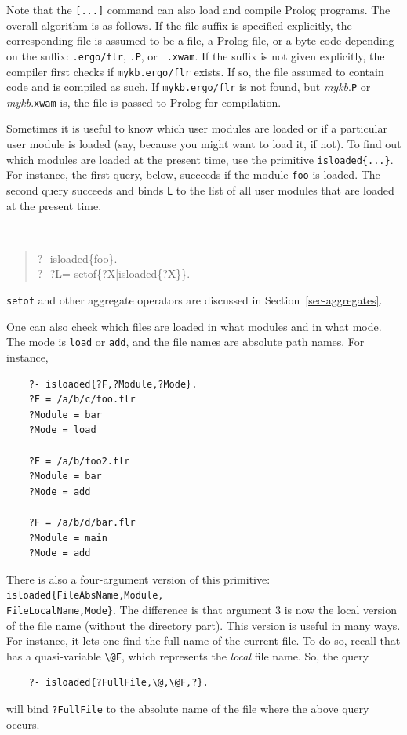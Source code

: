 \documentclass[11pt]{article}
\newcommand{\ERGO}{\mbox{\smaller{\ensuremath{\cal{E}}\smaller{{\sc{RGO}}}}}\xspace}
\newcommand{\FLSYSTEM}{\ERGO}
\newcommand{\flrext}{flr\xspace}
\newcommand{\ergoext}{ergo\xspace}
\newcommand{\bs}{\textbackslash}
\newcommand{\ofile}{xwam}
\begin{document}
Note that the {\tt [...]} command can also load and compile Prolog programs.
The overall algorithm is as follows. If the file suffix is specified
explicitly, the corresponding file is assumed to be a \FLSYSTEM file, a Prolog
file, or a byte code depending on the suffix: {\tt .\ergoext/\flrext}, {\tt .P}, or {\tt
  .\ofile}. If the suffix is not given explicitly, the compiler first checks if
\texttt{mykb.\ergoext/\flrext}  exists. If so, the file assumed to contain \FLSYSTEM
code and is compiled as such. If \texttt{mykb.\ergoext/\flrext}  is not found, but {\it
  mykb}.{\tt P} or {\it mykb}.{\tt xwam} is, the file is passed to Prolog for
compilation.


Sometimes it is useful to know which user modules are loaded or if a
particular user module is loaded (say, because you might want to load it,
if not).  To find out which modules are loaded at the present time, use the
primitive {\tt isloaded\{...\}}. For instance, the first query,
below, succeeds if the module {\tt foo} is loaded. The second query
succeeds and binds {\tt L} to the list of all user modules that are loaded
at the present time.
{\tt
\begin{quote}
 ?- isloaded\{foo\}.\\
 ?- ?L= setof\{?X|isloaded\{?X\}\}.
\end{quote}
}
\texttt{setof} and other aggregate operators are discussed in
Section~\ref{sec-aggregates}.

One can also check which files are loaded in what modules and in what mode.
The mode is \texttt{load} or \texttt{add}, and the file names are absolute
path names. For instance, 
\begin{verbatim}
    ?- isloaded{?F,?Module,?Mode}.
    ?F = /a/b/c/foo.flr
    ?Module = bar
    ?Mode = load

    ?F = /a/b/foo2.flr
    ?Module = bar
    ?Mode = add

    ?F = /a/b/d/bar.flr
    ?Module = main
    ?Mode = add
\end{verbatim}

There is also a four-argument version of this primitive:
\texttt{isloaded\{FileAbsName,Module,\\FileLocalName,Mode\}}. The difference
is that argument 3 is now the local version of the file name (without the
directory part). This version is useful in many ways. For instance, it lets
one find the full name of the current file. To do so, recall that \FLSYSTEM
has a quasi-variable \texttt{\bs{}@F}, which represents the \emph{local}
file name. So, the query
\begin{verbatim}
    ?- isloaded{?FullFile,\@,\@F,?}.
\end{verbatim}
will bind \texttt{?FullFile} to the absolute name of the file where the
above query occurs.
\end{document}
